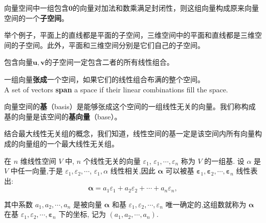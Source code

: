 \begin{definition}
    向量空间中一组包含$\boldsymbol{0}$的向量对加法和数乘满足封闭性，则这组向量构成原来向量空间的一个\textcolor{third}{\bf 子空间}。
\end{definition}

举个例子，平面上的直线都是平面的子空间，三维空间中的平面和直线都是三维空间的子空间。此外，平面和三维空间分别是它们自己的子空间。

\begin{proposition}
    包含向量$\boldsymbol{u},\boldsymbol{v}$的子空间一定包含二者的所有线性组合。
\end{proposition}

\begin{definition}
    一组向量\textcolor{third}{\bf 张成}一个空间，如果它们的线性组合布满的整个空间。\\
    A set of vectors \textcolor{third}{\bf span} a space if their linear combinations fill the space.
\end{definition}

\begin{definition}[基和基向量]
向量空间的\textcolor{third}{\bf 基}（basis）是能够张成这个空间的一组线性无关的向量。我们称构成基的向量是该空间的\textcolor{third}{\bf 基向量}（base）。
\end{definition}

\vspace{0.3cm}

\begin{note}
    结合最大线性无关组的概念，我们知道，线性空间的基一定是该空间内所有向量构成的向量组的一个最大线性无关组。
\end{note}

\vspace{0.3cm}

在 $n$ 维线性空间 $V$ 中, $n$ 个线性无关的向量 $\varepsilon_1$, $\varepsilon_1, \cdots, \varepsilon_n$ 称为 $V$ 的一组基. 设 $\alpha$ 是 $V$ 中任一向量,于是 $\varepsilon_1, \varepsilon_2, \cdots$, $\varepsilon_1, \alpha$ 线性相关,因此 $\boldsymbol{\alpha}$ 可以被基 $\boldsymbol{\varepsilon}_1, \boldsymbol{\varepsilon}_2, \cdots, \boldsymbol{\varepsilon}_n$ 线性表出:
$$
\boldsymbol{\alpha}=a_1 \varepsilon_1+a_2 \varepsilon_2+\cdots+a_n \varepsilon_n,
$$

其中系数 $a_1, a_2, \cdots, a_n$ 是被向量 $\boldsymbol{\alpha}$ 和基 $\varepsilon_1, \varepsilon_2, \cdots, \varepsilon_n$ 唯一确定的,这组数就称为 $\boldsymbol{\alpha}$ 在基 $\varepsilon_1, \varepsilon_2, \cdots, \boldsymbol{\varepsilon}_n$ 下的坐标, 记为 $\left(a_1, a_2, \cdots, a_n\right)$.

